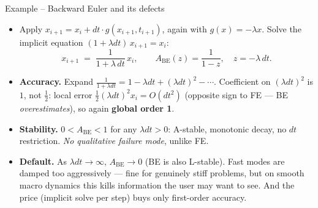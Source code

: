 \documentclass[11pt,aspectratio=169]{beamer}
\begin{document}
\begin{frame}{Example -- Backward Euler and its defects}

\begin{itemize}

\item Apply $x_{i+1} = x_i + dt\cdot g(x_{i+1},t_{i+1})$, again with
  $g(x)=-\lambda x$. Solve the implicit equation $(1+\lambda dt)\,x_{i+1} = x_i$:
  \[
  \boxed{\;x_{i+1} \;=\; \frac{1}{1+\lambda\,dt}\,x_i,\qquad A_{\mathrm{BE}}(z) = \frac{1}{1-z},\quad z=-\lambda\,dt.\;}
  \]

\item \textbf{Accuracy.} Expand $\tfrac{1}{1+\lambda dt} = 1 - \lambda
  dt + (\lambda dt)^2 - \cdots$. Coefficient on $(\lambda dt)^2$ is
  $1$, not $\tfrac12$: local error $\tfrac12(\lambda dt)^2 x_i = O(dt^2)$
  (opposite sign to FE — BE \emph{overestimates}), so again
  \textbf{global order 1}.\newline

\item \textbf{Stability.} $0 < A_{\mathrm{BE}} < 1$ for any $\lambda
  dt > 0$: A-stable, monotonic decay, no $dt$ restriction. \emph{No
  qualitative failure mode}, unlike FE.\newline

\item \textbf{Default.} As $\lambda dt \to \infty$, $A_{\mathrm{BE}}
  \to 0$ (BE is also L-stable). Fast modes are damped too aggressively
  — fine for genuinely stiff problems, but on smooth
  macro dynamics this kills information the user may want to see. And
  the price (implicit solve per step) buys only first-order accuracy.

\end{itemize}

\end{frame}
\end{document}
